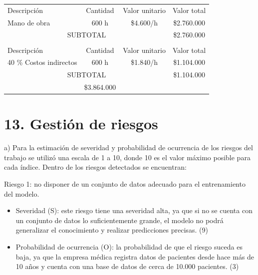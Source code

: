 \documentclass[
11pt, %
]{charter}
\begin{document}
\begin{table}[htpb]
\centering
\begin{tabularx}{\linewidth}{@{}|X|c|r|r|@{}}
\hline
\rowcolor[HTML]{C0C0C0} 
\multicolumn{4}{|c|}{\cellcolor[HTML]{C0C0C0}COSTOS DIRECTOS} \\ \hline
\rowcolor[HTML]{C0C0C0} 
Descripción &
  \multicolumn{1}{c|}{\cellcolor[HTML]{C0C0C0}Cantidad} &
  \multicolumn{1}{c|}{\cellcolor[HTML]{C0C0C0}Valor unitario} &
  \multicolumn{1}{c|}{\cellcolor[HTML]{C0C0C0}Valor total} \\ \hline
  
 Mano de obra &
  \multicolumn{1}{c|}{600 h} &
  \multicolumn{1}{c|}{\$4.600/h} &
  \multicolumn{1}{c|}{\$2.760.000} \\ \hline
\multicolumn{3}{|c|}{SUBTOTAL} &
  \multicolumn{1}{c|}{\$2.760.000} \\ \hline
\rowcolor[HTML]{C0C0C0} 
\multicolumn{4}{|c|}{\cellcolor[HTML]{C0C0C0}COSTOS INDIRECTOS} \\ \hline
\rowcolor[HTML]{C0C0C0} 
Descripción &
  \multicolumn{1}{c|}{\cellcolor[HTML]{C0C0C0}Cantidad} &
  \multicolumn{1}{c|}{\cellcolor[HTML]{C0C0C0}Valor unitario} &
  \multicolumn{1}{c|}{\cellcolor[HTML]{C0C0C0}Valor total} \\ \hline
\multicolumn{1}{|l|}{40 \% Costos indirectos} &
 \multicolumn{1}{c|}{600 h} &
  \multicolumn{1}{c|}{\$1.840/h} &
  \multicolumn{1}{c|}{\$1.104.000} \\ \hline
\multicolumn{3}{|c|}{SUBTOTAL} &
  \multicolumn{1}{c|}{\$1.104.000} \\ \hline
\rowcolor[HTML]{C0C0C0}
\multicolumn{3}{|c|}{TOTAL} & \$3.864.000
   \\ \hline
\end{tabularx}%
\end{table}


\section{13. Gestión de riesgos}
\label{sec:riesgos}

a) Para la estimación de severidad y probabilidad de ocurrencia de los riesgos del trabajo se utilizó una escala de 1 a 10, donde 10 es el valor máximo posible para cada índice. Dentro de los riesgos detectados se encuentran:

Riesgo 1: no disponer de un conjunto de datos adecuado para el entrenamiento del modelo.
\begin{itemize}
	\item Severidad (S): este riesgo tiene una severidad alta, ya que si no se cuenta con un conjunto de datos lo suficientemente grande, el modelo no podrá generalizar el conocimiento y realizar predicciones precisas. (9)
	\item Probabilidad de ocurrencia (O): la probabilidad de que el riesgo suceda es baja, ya que la empresa médica registra datos de pacientes desde hace más de 10 años y cuenta con una base de datos de cerca de 10.000 pacientes. (3)
\end{itemize}   
\end{document}
